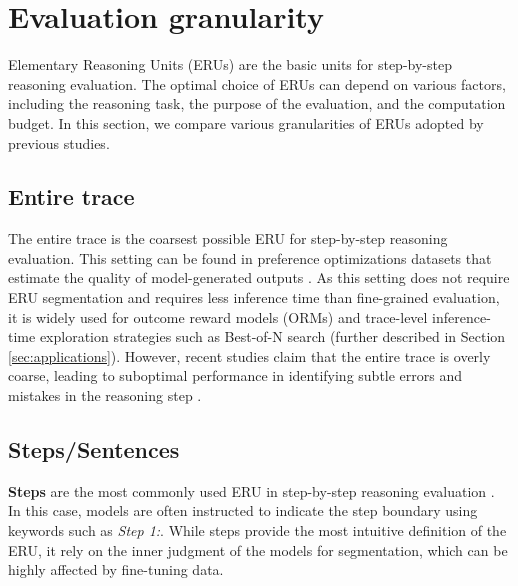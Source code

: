\section{Evaluation granularity}
\label{sec:eru}

Elementary Reasoning Units (ERUs) are the basic units for step-by-step reasoning evaluation. The optimal choice of ERUs can depend on various factors, including the reasoning task, the purpose of the evaluation, and the computation budget. In this section, we compare various granularities of ERUs adopted by previous studies.

\subsection{Entire trace}

The entire trace is the coarsest possible ERU for step-by-step reasoning evaluation. This setting can be found in preference optimizations datasets that estimate the quality of model-generated outputs \citep{cui2024ultrafeedbackboostinglanguagemodels, kim2024biggenbenchprincipledbenchmark}. As this setting does not require ERU segmentation and requires less inference time than fine-grained evaluation, it is widely used for outcome reward models (ORMs) and trace-level inference-time exploration strategies such as Best-of-N search (further described in Section \ref{sec:applications}). However, recent studies claim that the entire trace is overly coarse, leading to suboptimal performance in identifying subtle errors and mistakes in the reasoning step \citep{DBLP:conf/iclr/LightmanKBEBLLS24, zheng2024processbenchidentifyingprocesserrors}.


\subsection{Steps/Sentences}

\textbf{Steps} are the most commonly used ERU in step-by-step reasoning evaluation \citep{DBLP:conf/iclr/LightmanKBEBLLS24, NEURIPS2023_72393bd4, lai2024stepdpostepwisepreferenceoptimization, wang-etal-2024-math, lu2024stepcontrolleddpoleveragingstepwise}. In this case, models are often instructed to indicate the step boundary using keywords such as \textit{Step 1:}. While steps provide the most intuitive definition of the ERU, it rely on the inner judgment of the models for segmentation, which can be highly affected by fine-tuning data.

